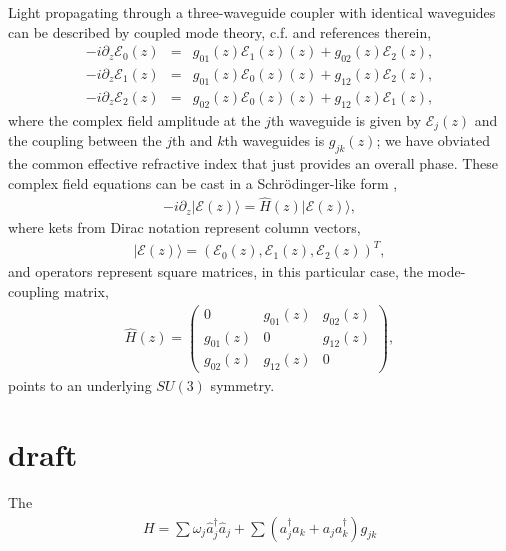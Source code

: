 \documentclass[9pt,twocolumn,twoside]{osajnl}
\begin{document}
Light propagating through a three-waveguide coupler with identical waveguides can be described by coupled mode theory, c.f. \cite{RodriguezLara2015p068014} and references therein,
\begin{eqnarray}
-i \partial_{z} \mathcal{E}_{0}(z) &=&  g_{01}(z) \mathcal{E}_{1}(z)(z) + g_{02}(z) \mathcal{E}_{2}(z), \\
 -i \partial_{z} \mathcal{E}_{1}(z) &=& g_{01}(z) \mathcal{E}_{0}(z)(z) + g_{12}(z) \mathcal{E}_{2}(z), \\
 -i \partial_{z} \mathcal{E}_{2}(z) &=& g_{02}(z) \mathcal{E}_{0}(z)(z) + g_{12}(z) \mathcal{E}_{1}(z),
\end{eqnarray}
where the complex field amplitude at the $j$th waveguide is given by $\mathcal{E}_{j}(z)$ and the coupling between the $j$th and $k$th waveguides is $g_{jk}(z)$; we have obviated the common effective refractive index that just provides an overall phase.
These complex field equations can be cast in a Schr\"odinger-like form \cite{RodriguezLara2015p068014},
\begin{eqnarray}
- i \partial_{z} \vert \mathcal{E}(z) \rangle = \hat{H}(z) \vert \mathcal{E}(z) \rangle,\label{eq:diff}
\end{eqnarray}
where kets from Dirac notation represent column vectors,
\begin{eqnarray}
\vert \mathcal{E}(z) \rangle = \left( \mathcal{E}_{0}(z), \mathcal{E}_{1}(z), \mathcal{E}_{2}(z) \right)^{T}, 
\end{eqnarray}
and operators represent square matrices, in this particular case, the mode-coupling matrix,
\begin{eqnarray}
\hat{H}(z) = \left( \begin{array}{ccc} 
0  & g_{01}(z) & g_{02}(z) \\
g_{01}(z) & 0 & g_{12}(z) \\
g_{02}(z) & g_{12}(z) & 0
\end{array} \right), \label{eq:hmlt}
\end{eqnarray}
points to an underlying $SU(3)$ symmetry.


\section{draft}
The 
\begin{eqnarray}
	H = \sum{\omega_j \hat{a}^{\dagger}_j \hat{a}_j} + \sum{(a^{\dagger}_j a_k+a_j a^{\dagger}_k)g_{jk}}
\end{eqnarray}
\end{document}
